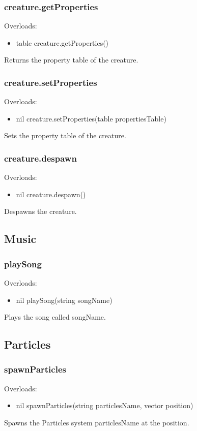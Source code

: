 \documentclass{book}
\newenvironment{ulist}
	{\begin{itemize}
			\itemsep0em}
	{\end{itemize}}
\begin{document}
\subsubsection{creature.getProperties}
Overloads:
\begin{ulist}
	\item table creature.getProperties()
\end{ulist}
Returns the property table of the creature.

\subsubsection{creature.setProperties}
Overloads:
\begin{ulist}
	\item nil creature.setProperties(table propertiesTable)
\end{ulist}
Sets the property table of the creature.

\subsubsection{creature.despawn}
Overloads:
\begin{ulist}
	\item nil creature.despawn()
\end{ulist}
Despawns the creature.

\subsection{Music}
\subsubsection{playSong}
Overloads:
\begin{ulist}
	\item nil playSong(string songName)
\end{ulist}
Plays the song called songName.


\subsection{Particles}
\subsubsection{spawnParticles}
Overloads:
\begin{ulist}
	\item nil spawnParticles(string particlesName, vector position)
\end{ulist}
Spawns the Particles system particlesName at the position.
\end{document}
